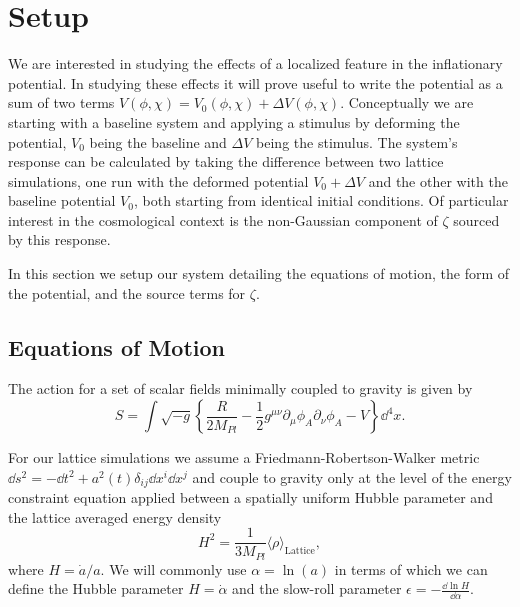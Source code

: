 
\section{Setup} \label{sec:setup}
We are interested in studying the effects of a localized feature in the inflationary potential.
In studying these effects it will prove useful to write the potential as a sum of two terms $V(\phi,\chi) = V_0(\phi,\chi) + \Delta V(\phi,\chi)$.
Conceptually we are starting with a baseline system and applying a stimulus by deforming the potential, $V_0$ being the baseline and $\Delta V$ being the stimulus.
The system's response can be calculated by taking the difference between two lattice simulations, one run with the deformed potential $V_0+\Delta V$ and the other with the baseline potential $V_0$, both starting from identical initial conditions.
Of particular interest in the cosmological context is the non-Gaussian component of $\zeta$ sourced by this response.

In this section we setup our system detailing the equations of motion, the form of the potential, and the source terms for $\zeta$.

\subsection{Equations of Motion}

The action for a set of scalar fields minimally coupled to gravity is given by
\begin{equation} \label{eq:action}
  S = \int \sqrt{-g}\left\{\frac{R}{2M_{Pl}} - \frac{1}{2}g^{\mu\nu}\partial_\mu\phi_A\partial_\nu\phi_A - V \right\}\dd^4x.
\end{equation} 


For our lattice simulations we assume a Friedmann-Robertson-Walker metric $\dd s^2 = -\dd t^2 +a^2(t) \delta_{ij}\dd x^i \dd x^j$ and couple to gravity only at the level of the energy constraint equation applied between a spatially uniform Hubble parameter and the lattice averaged energy density
\begin{equation} \label{eq:energy constraint}
  H^2 = \frac{1}{3M_{Pl}}\langle \rho \rangle_{\mathrm{Lattice}},
\end{equation} 
where $H = \dot{a}/a$. We will commonly use $\alpha = \ln(a)$ in terms of which we can define the Hubble parameter $H = \dot{\alpha}$ and the slow-roll parameter $\epsilon = -\frac{\dd\ln H}{\dd \alpha}.$

